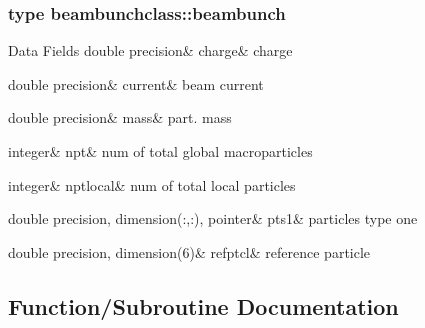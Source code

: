 \subsubsection{type beambunchclass\+::beambunch}
\begin{DoxyFields}{Data Fields}
\mbox{\label{namespacebeambunchclass_a555bb0dc53871a3f69755125598c8938}} 
double precision&
charge&
charge \\
\hline

\mbox{\label{namespacebeambunchclass_a0611d8fb67f60eb1ea7a3df79c5de915}} 
double precision&
current&
beam current \\
\hline

\mbox{\label{namespacebeambunchclass_abeaad3b1ce823a9c49cab5a8b96f5ff0}} 
double precision&
mass&
part. mass \\
\hline

\mbox{\label{namespacebeambunchclass_a20f5303645e1b7fa0cbfa88f81cda947}} 
integer&
npt&
num of total global macroparticles \\
\hline

\mbox{\label{namespacebeambunchclass_a71a8687235fdc19d862fb13092b714a3}} 
integer&
nptlocal&
num of total local particles \\
\hline

\mbox{\label{namespacebeambunchclass_af0d19c1e3e537ade010af8554783c8d7}} 
double precision, dimension(:,:), pointer&
pts1&
particles type one \\
\hline

\mbox{\label{namespacebeambunchclass_a973e0e4ee1b24185bac1d727d2c074f5}} 
double precision, dimension(6)&
refptcl&
reference particle \\
\hline

\end{DoxyFields}


\subsection{Function/\+Subroutine Documentation}
\mbox{\label{namespacebeambunchclass_a1605e527eb41043dc5962da1e3bb5159}} 
